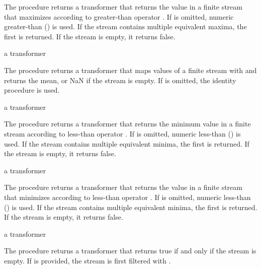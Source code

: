 The  procedure returns a transformer that returns the value  in a
finite stream that maximizes  according to greater-than
operator . If  is omitted, numeric greater-than (\code{>}) is used. If the
stream contains multiple equivalent maxima, the first is returned. If the stream is empty,
it returns false.

\begin{procedure}
\end{procedure}
\returns{} a transformer

The  procedure returns a transformer that maps values of a finite stream with
 and returns the mean, or NaN if the stream is empty. If  is
omitted, the identity procedure is used.

\begin{procedure}
\end{procedure}
\returns{} a transformer

The  procedure returns a transformer that returns the minimum value in a
finite stream according to less-than operator . If  is omitted, numeric
less-than (\code{<}) is used. If the stream contains multiple equivalent minima, the first
is returned. If the stream is empty, it returns false.

\begin{procedure}
\end{procedure}
\returns{} a transformer

The  procedure returns a transformer that returns the value  in a
finite stream that minimizes  according to less-than
operator . If  is omitted, numeric less-than (\code{<}) is used. If the
stream contains multiple equivalent minima, the first is returned. If the stream is empty,
it returns false.

\begin{procedure}
\end{procedure}
\returns{} a transformer

The  procedure returns a transformer that returns true if and only if
the stream is empty. If  is provided, the stream is first filtered
with .

